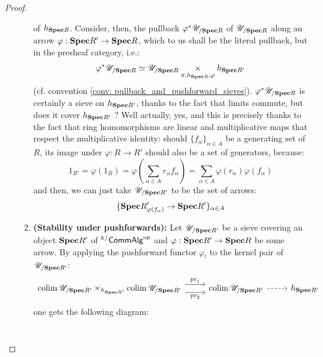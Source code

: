\begin{proof}
\begin{enumerate}
\begin{enumerate}
                                        of $h_{\Spec R}$. Consider, then, the pullback $\varphi^* \U_{/\Spec R}$ of $\U_{/\Spec R}$ along an arrow $\varphi: \Spec R' \to \Spec R$, which to us shall be the literal pullback, but in the presheaf category, i.e.:
                                            $$\varphi^* \U_{/\Spec R} \cong \U_{/\Spec R} \x_{\pi, h_{\Spec R}, \varphi} h_{\Spec R'}$$
                                        (cf. convention \ref{conv: pullback_and_pushforward_sieves}). $\varphi^* \U_{/\Spec R}$ is certainly a sieve on $h_{\Spec R'}$, thanks to the fact that limits commute, but does it cover $h_{\Spec R'}$ ? Well actually, yes, and this is precisely thanks to the fact that ring homomorphisms are linear and multiplicative maps that respect the multiplicative identity: should $\{f_{\alpha}\}_{\alpha \in A}$ be a generating set of $R$, its image under $\varphi: R \to R'$ should also be a set of generators, because:
                                            $$1_{R'} = \varphi(1_R) = \varphi\left(\sum_{\alpha \in A} r_{\alpha} f_{\alpha}\right) = \sum_{\alpha \in A} \varphi(r_{\alpha}) \varphi(f_{\alpha})$$
                                        and then, we can just take $\U_{/\Spec R'}$ to be the set of arrows:
                                            $$\{\Spec R'_{\varphi(f_{\alpha})} \to \Spec R'\}_{\alpha \in A}$$
                                        \item \textbf{(Stability under pushforwards):} Let $\U_{/\Spec R'}$ be a sieve covering an object $\Spec R'$ of ${}^{k/}\Comm\Alg^{\op}$ and $\varphi: \Spec R' \to \Spec R$ be some arrow. By applying the pushforward functor $\varphi_!$ to the kernel pair of $\U_{/\Spec R'}$:
                                            $$
                                                \begin{tikzcd}
                                                	{\colim \U_{/\Spec R'} \x_{h_{\Spec R'}} \colim \U_{/\Spec R'}} & {\colim \U_{/\Spec R'}} & {h_{\Spec R'}}
                                                	\arrow["\pr_2"', shift right=2, from=1-1, to=1-2]
                                                	\arrow["\pr_1", shift left=2, from=1-1, to=1-2]
                                                	\arrow[dashed, from=1-2, to=1-3]
                                                \end{tikzcd}
                                            $$
                                        one gets the following diagram:
                                            $$
                                                \begin{tikzcd}

\end{tikzcd}$$
\end{enumerate}
\end{enumerate}
\end{proof}
